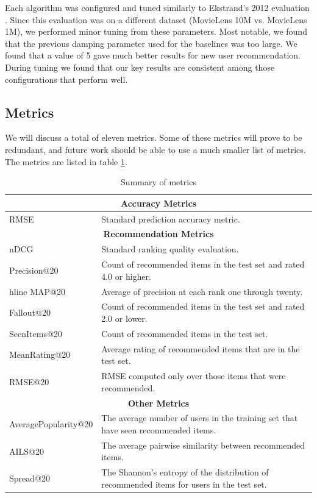 \documentclass[letterpaper]{sig-alternate}
\begin{document}
  Each algorithm was configured and tuned similarly to Ekstrand's 2012 evaluation \cite{ekstrand2012recommenders}.
  Since this evaluation was on a different dataset (MovieLens 10M vs. MovieLens 1M), we performed minor tuning from these parameters.
  Most notable, we found that the previous damping parameter used for the baselines was too large.
  We found that a value of 5 gave much better results for new user recommendation.
  During tuning we found that our key results are consistent among those configurations that perform well.

  \subsection*{Metrics}
  We will discuss a total of eleven metrics.
  Some of these metrics will prove to be redundant, and future work should be able to use a much smaller list of metrics.
  The metrics are listed in table \ref{tbl:metrics}.
  \begin{table}[ht!]
    \centering
    \begin{tabular}{|p{7em}|p{16em}|}
      \hline
      \multicolumn{2}{|c|}{{\bf Accuracy Metrics}} \\\hline
      RMSE                   & Standard prediction accuracy metric. \\\hline
      \hline
      \multicolumn{2}{|c|}{{\bf Recommendation Metrics}} \\\hline
      nDCG                   & Standard ranking quality evaluation.\\\hline
      Precision@20           & Count of recommended items in the test set and rated 4.0 or higher\footnotemark[1].\\hline
      MAP@20                 & Average of precision at each rank one through twenty.\\\hline
      Fallout@20             & Count of recommended items in the test set and rated 2.0 or lower\footnotemark[1].\\\hline
      SeenItems@20           & Count of recommended items in the test set.\\\hline
      MeanRating@20          & Average rating of recommended items that are in the test set.\\\hline
      RMSE@20                & RMSE computed only over those items that were recommended.\\\hline
      \hline
      \multicolumn{2}{|c|}{{\bf Other Metrics}} \\\hline
      Average\-Popularity@20 & The average number of users in the training set that have seen recommended items.\\\hline
      AILS@20                & The average pairwise similarity between recommended items. \\\hline
      Spread@20              & The Shannon's entropy of the distribution of recommended items for users in the test set.\\\hline
    \end{tabular}
    \caption{Summary of metrics}
    \label{tbl:metrics}
  \end{table}
  
\end{document}
